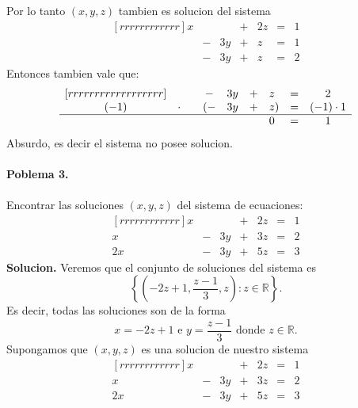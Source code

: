 \documentclass{article}
\theoremstyle{definition}
\theoremstyle{definition}
\theoremstyle{remark}
\begin{document}
Por lo tanto $(x,y,z)$ tambien es solucion del sistema \[
 \begin{matrix}[rrrrrrrrrrrr]
     x &  & & + & 2z& = & 1  \\
      & - & 3y & + & z & = & 1 \\
      & - & 3y & + & z & = &  2 
  \end{matrix}
\]
Entonces tambien vale que: \[
 \begin{matrix}[rrrrrrrrrrrrrrrrrr]
&&  & - & 3y & + & z\phantom{)} & = & 2 \\
    (-1) & \cdot & &(- & 3y& + & z ) & = & (-1) \cdot 1 \\
    \hline 
         & &  &  &  &  & 0 \phantom{)} & = & 1
  \end{matrix}
\]
Absurdo, es decir el sistema no posee solucion.
\\\\
\textbf{Poblema 3.}\\\\
Encontrar las soluciones $(x,y,z)$ del sistema de ecuaciones:
\[\begin{matrix}[rrrrrrrrrrrr]
     x  &   &    & + & 2z & = & 1  \\
     x  & - & 3y & + & 3z & = & 2 \\
     2x & - & 3y & + & 5z & = & 3
  \end{matrix}
\]\textbf{Solucion.} Veremos que el conjunto de soluciones del sistema es \[
  \left\{\left(-2z+1,\frac{z-1}{3},z\right) : z \in \mathbb{R}\right\}.
\]
Es decir, todas las soluciones son de la forma \[
  x=-2z+1 \text{ e } y=\frac{z-1}{3} \text{ donde } z \in \mathbb{R}.
\]
Supongamos que $(x,y,z)$ es una solucion de nuestro sistema
\[\begin{matrix}[rrrrrrrrrrrr]
     x  &   &    & + & 2z & = & 1  \\
     x  & - & 3y & + & 3z & = & 2 \\
     2x & - & 3y & + & 5z & = & 3
  \end{matrix}
\]
\end{document}
